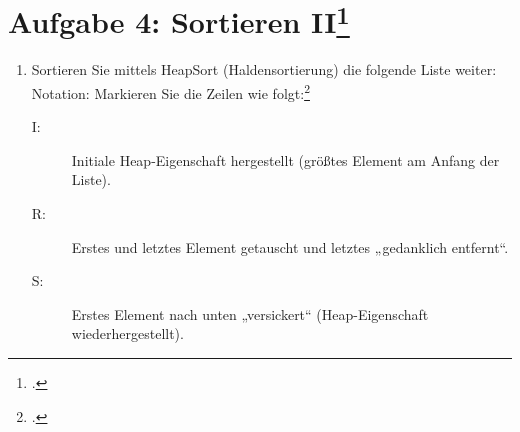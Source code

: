 \documentclass{lehramt-informatik-minimal}
\begin{document}
\section{Aufgabe 4: Sortieren II\footcite[entnommen aus Algorithmen und
Datenstrukturen, Übungsblatt 4, Universität Würzburg]{aud:pu:7}}

\begin{enumerate}


\item Sortieren Sie mittels HeapSort (Haldensortierung) die folgende
Liste weiter: Notation: Markieren Sie die Zeilen wie
folgt:\footcite[Staatsexamen Theoretische Informatik, Algorithmen und
Datenstrukturen, Realschulen, Frühjahr 2013, Thema 2, Aufgabe 6
(Auszug)]{examen:46115:2013:03}

\begin{description}
\item[I:] Initiale Heap-Eigenschaft hergestellt (größtes Element am
Anfang der Liste).

\item[R:] Erstes und letztes Element getauscht und letztes „gedanklich
entfernt“.

\item[S:] Erstes Element nach unten „versickert“ (Heap-Eigenschaft
wiederhergestellt).
\end{description}

\end{enumerate}
\end{document}
